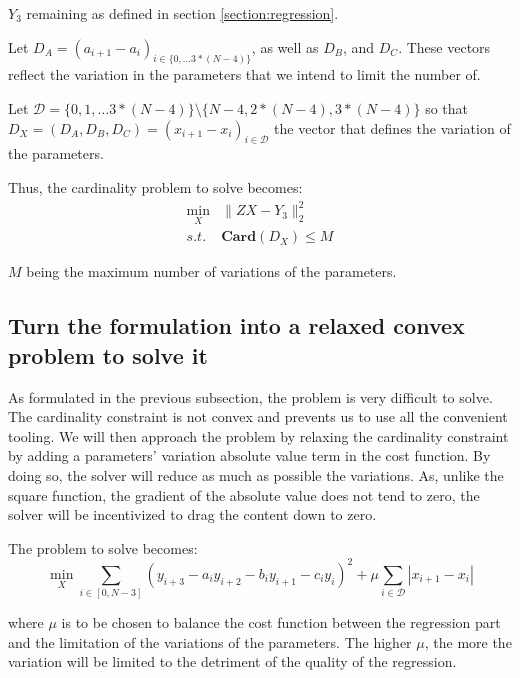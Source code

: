 \documentclass[11pt]{article}
\begin{document}
        $Y_3$ remaining as defined in section \ref{section:regression}. 
        
        Let $D_A = (a_{i+1} - a_i)_{i \in \{0,\ldots 3*(N-4)\}}$, as well as $D_B$, and $D_C$. These vectors reflect the variation in the parameters that we intend to limit the number of.

        Let $\mathcal{D} = \{0,1,\ldots 3*(N-4)\}\setminus\{N-4, 2*(N-4), 3*(N-4)\} $
        so that $ D_X = (D_A, D_B, D_C) = (x_{i+1} - x_i)_{i \in \mathcal{D}} $ the vector that defines the variation of the parameters. 
        
        Thus, the cardinality problem to solve becomes:
        \begin{equation*}
            \begin{aligned}
                \min_{X}&{\lVert ZX - Y_3 \rVert^2_2} \\
                    s.t.    & \bm{Card}(D_X) \le M
            \end{aligned}
        \end{equation*}

        $M$ being the maximum number of variations of the parameters.
    
    \subsection{Turn the formulation into a relaxed convex problem to solve it}
        As formulated in the previous subsection, the problem is very difficult to solve. The cardinality constraint is not convex and prevents us to use all the convenient tooling. We will then approach the problem by relaxing the cardinality constraint by adding a parameters' variation absolute value term in the cost function. By doing so, the solver will reduce as much as possible the variations. As, unlike the square function, the  gradient of the absolute value does not tend to zero, the solver will be incentivized to drag the content down to zero.

        The problem to solve becomes:
        \begin{equation}
            \label{eq:equation abs}
                \min_{X}{\sum_{i\in[0, N-3]}{(y_{i+3}  - a_i y_{i+2} - b_i y_{i+1} - c_i y_i)^2} + \mu\sum_{i \in \mathcal{D}}{|x_{i+1} - x_i|}}
        \end{equation}
        
        where $\mu$ is to be chosen to balance the cost function between the regression part and the limitation of the variations of the parameters. The higher $\mu$, the more the variation will be limited to the detriment of the quality of the regression.
\end{document}
